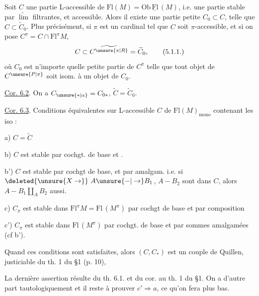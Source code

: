 \margin{$\big|$} Soit  $C$ une partie L-accessible de $\mathrm{Fl}(M)=\mathrm{Ob}\,\underline{\mathrm{Fl}}\,(M)$, i.e.  une partie stable par $\underrightarrow{\lim}$ filtrantes, et accessible.  
 Alors  il existe une partie petite $C_0\subset C$, telle que $C\subset\widetilde C_0$. Plus précisément, si $\pi$ est un  cardinal tel que $C$ soit $\pi$-accessible, et si on pose $C^\pi=C\cap\mathrm{Fl}^\pi M$,  
\[
 C\subset\widetilde{C^{\unsure{\pi|R}}}=\widetilde C_0,
 \tag*{(5.1.1.)}
\]
où $C_0$ est n'importe quelle petite partie de $C^\pi$ telle que tout objet de $C^{\unsure{P|\pi}}$ soit isom. à un objet de $C_0$.

\uline{Cor. 6.2}. On a $C_{\unsure{\ast|\alpha}}=C_{0\ast}$, $\widetilde C=\widetilde C_0$.


\uline{Cor. 6.3}. Conditions équivalentes sur   L-accessible $C$ de $\mathrm{Fl}(M)_{\mathrm{mono}}$ \unsure{;} contenant les iso :

a) $C=\widetilde C$

b) $C$ est stable par cochgt. de base et .

b') $C$ est stable par cochgt de base, et par  amalgam.  i.e. si $\deleted{\unsure{X\to}}\ A\unsure{-|\to} B_1$, $A-B_2$ sont dans $C$, alors $A-B_1\amalg_A B_2$ aussi.

c) $C_\pi$ est stable dans $\mathrm{Fl}^\pi M=\mathrm{Fl}\,(M^\pi)$ par cochgt de base et par composition

c') $C_\pi$ est stable dans $\mathrm{Fl}\,(M^\pi)$ par cochgt. de base et par sommes amalgamées (cf b').

Quand ces conditions sont satisfaites, alors $(C,C_\ast)$ est un couple de Quillen, justiciable du th. 1 du §1 (p. 10), 

La dernière assertion résulte du th. 6.1. et du cor. au th. 1 du §1. On a
d'autre part tautologiquement
et il reste à prouver $c'\Longrightarrow a$, ce qu'on fera plus bas.

